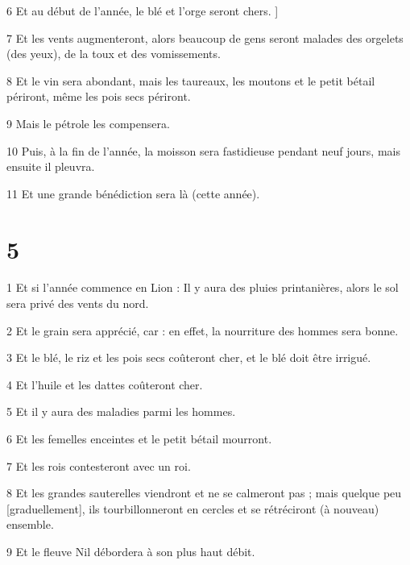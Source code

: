 \par 6 Et au début de l'année, le blé et l'orge seront chers. ]

\par 7 Et les vents augmenteront, alors beaucoup de gens seront malades des orgelets (des yeux), de la toux et des vomissements.

\par 8 Et le vin sera abondant, mais les taureaux, les moutons et le petit bétail périront, même les pois secs périront.

\par 9 Mais le pétrole les compensera.

\par 10 Puis, à la fin de l'année, la moisson sera fastidieuse pendant neuf jours, mais ensuite il pleuvra.

\par 11 Et une grande bénédiction sera là (cette année).


\chapter{5}

\par 1 Et si l'année commence en Lion : Il y aura des pluies printanières, alors le sol sera privé des vents du nord.

\par 2 Et le grain sera apprécié, car : en effet, la nourriture des hommes sera bonne.

\par 3 Et le blé, le riz et les pois secs coûteront cher, et le blé doit être irrigué.

\par 4 Et l'huile et les dattes coûteront cher.

\par 5 Et il y aura des maladies parmi les hommes.

\par 6 Et les femelles enceintes et le petit bétail mourront.

\par 7 Et les rois contesteront avec un roi.

\par 8 Et les grandes sauterelles viendront et ne se calmeront pas ; mais quelque peu [graduellement], ils tourbillonneront en cercles et se rétréciront (à nouveau) ensemble.

\par 9 Et le fleuve Nil débordera à son plus haut débit.

